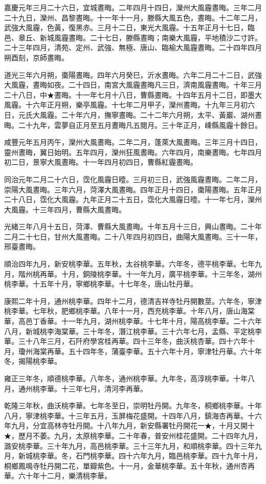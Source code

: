 \begin{pinyinscope}
嘉慶元年三月二十六日，宜城晝晦。二年四月十四日，灤州大風霾晝晦。三年二月二十九日，灤州、昌黎晝晦。十一年十一月，滕縣大風五色，晝晦。十二年二月，武強大風霾，色黃，復黑赤。三月十二日，東光大風霾。十五年正月十七日，臨邑、章丘、新城風霾晝晦。二十七日，滕縣晝晦；南樂大風霾，平地積沙二寸許。二十三年四月，清苑、定州、武強、無極、唐山、臨榆大風霾晝晦。二十四年四月朔酉刻，京師晝晦。

道光三年六月朔，棗陽晝晦。四年六月癸巳，沂水晝晦。六年二月二十二日，武強大風霾，晝晦如夜。二十四日，南宮大風霾晝晦凡三日，濟南風霾晝晦。十年三月二十八日，中★晝晦。十一年七月十八日，曹縣晝晦。十四年五月十二日，即墨大風霾。十六年正月朔，樂亭風霾。十七年二月甲子，灤州晝晦。十九年三月初六日，元氏大風霾。二十年六月，撫寧晝晦。二十二年六月朔，太平、黃巖、湖州晝晦。二十九年，雲夢自正月至五月晝晦凡五閱月。三十年正月，嵊縣風霾十餘日。

咸豐元年五月丙午，灤州大風晝晦。二年二月，蓬萊大風晝晦。三年三月十四日，靈州晝晦，翼日始明。五年四月，灤州狂風晝晦。六年四月，南樂晝晦。七年四月初二日，景寧大風晝晦。十一年四月初四日，曹縣紅霾晝晦。

同治元年二月二十六日，霑化風霾日曀。三月初三日，武強風霾晝晦。二年二月，崇陽大風晝晦。三年六月，菏澤大風晝晦。四年正月十四日，棗陽晝晦。五年正月二十八日，霑化大風霾。九年正月二十五日，霑化大風霾日曀。十一年七月，灤州大風霾。十三年四月，曹縣大風晝晦。

光緒三年八月十五日，菏澤、曹縣大風晝晦。十年五月十三日，興山晝晦。二十年二月二十七日，甘州大風晝晦。二十八年四月初四日，曲陽大風晝晦。三十一年，邢臺晝晦。

順治四年九月，新安桃李華。五年秋，太谷桃李華。六年冬，德平桃李華。七年九月，階州桃再華。十月，銅陵桃李華。十一年九月，廣平桃李華。十三年冬，湖州桃李華。十五年十月，寧鄉桃李華。十七年冬，唐山牡丹華。

康熙二年十月，通州桃李華。四年十二月，德清吉祥寺牡丹開數莖。六年冬，寧津桃李華。七年秋，肥鄉桃李華。八年十一月，西充桃李華。十年八月，唐山海棠華，高邑丁香華。十一年九月，湖州桃李華。十七年十月，陽高桃李華。二十六年八月，新城桃李海棠華。三十年冬，潛江桃李華。三十六年七月，孟縣、平定桃李華。三十八年三月，石阡府學宮桂再華。四十三年冬，曲沃桃杏華。四十六年十月，瓊州海棠再華。五十四年冬，蒲臺李華。五十六年十月，寧津牡丹華。六十年冬，揭陽桃李華。

雍正三年冬，順德桃李華。八年冬，通州桃李華。九年冬，高淳桃李華。十年八月，通州桃李華。十三年七月，清河李再華。

乾隆三年秋，曲沃桃李華。七年冬至日，崇明牡丹開。九年冬，桐鄉桃李華。十年八月，寧津桃李華。十三年五月，玉屏梅花盛開。十四年八月，鎮海杏再華。十六年九月，分宜高林寺牡丹開。十八年九月，新安縣署牡丹開花一★，十月又開十★，歷月不萎。九月，太原桃李華。二十年春，普安州桂花盛開。二十四年九月，潞安桃李華。三十年九月，高邑桃李華。三十三年九月，和順桃李華。四十三年九月，新城桃李華。冬，石門桃李華。四十六年九月，臨邑桃李華。四十九年十月，桐鄉鳳鳴寺牡丹開二花，單瓣紫色。十一月，金華桃李華。五十年秋，通州杏再華。六十年十二月，樂清桃李華。


\end{pinyinscope}
